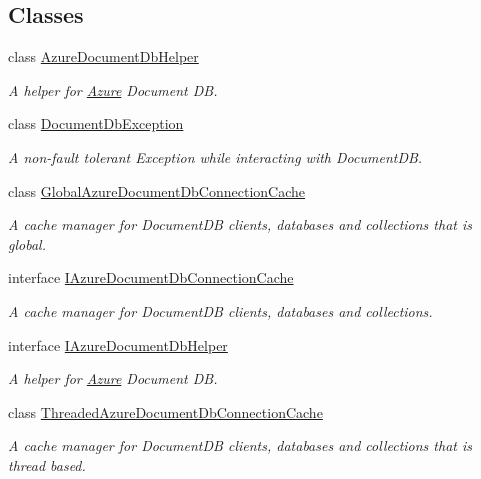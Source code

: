 \subsection*{Classes}
\begin{DoxyCompactItemize}
\item 
class \hyperlink{classCqrs_1_1Azure_1_1DocumentDb_1_1AzureDocumentDbHelper}{Azure\+Document\+Db\+Helper}
\begin{DoxyCompactList}\small\item\em A helper for \hyperlink{namespaceCqrs_1_1Azure}{Azure} Document DB. \end{DoxyCompactList}\item 
class \hyperlink{classCqrs_1_1Azure_1_1DocumentDb_1_1DocumentDbException}{Document\+Db\+Exception}
\begin{DoxyCompactList}\small\item\em A non-\/fault tolerant Exception while interacting with Document\+DB. \end{DoxyCompactList}\item 
class \hyperlink{classCqrs_1_1Azure_1_1DocumentDb_1_1GlobalAzureDocumentDbConnectionCache}{Global\+Azure\+Document\+Db\+Connection\+Cache}
\begin{DoxyCompactList}\small\item\em A cache manager for Document\+DB clients, databases and collections that is global. \end{DoxyCompactList}\item 
interface \hyperlink{interfaceCqrs_1_1Azure_1_1DocumentDb_1_1IAzureDocumentDbConnectionCache}{I\+Azure\+Document\+Db\+Connection\+Cache}
\begin{DoxyCompactList}\small\item\em A cache manager for Document\+DB clients, databases and collections. \end{DoxyCompactList}\item 
interface \hyperlink{interfaceCqrs_1_1Azure_1_1DocumentDb_1_1IAzureDocumentDbHelper}{I\+Azure\+Document\+Db\+Helper}
\begin{DoxyCompactList}\small\item\em A helper for \hyperlink{namespaceCqrs_1_1Azure}{Azure} Document DB. \end{DoxyCompactList}\item 
class \hyperlink{classCqrs_1_1Azure_1_1DocumentDb_1_1ThreadedAzureDocumentDbConnectionCache}{Threaded\+Azure\+Document\+Db\+Connection\+Cache}
\begin{DoxyCompactList}\small\item\em A cache manager for Document\+DB clients, databases and collections that is thread based. \end{DoxyCompactList}\end{DoxyCompactItemize}

